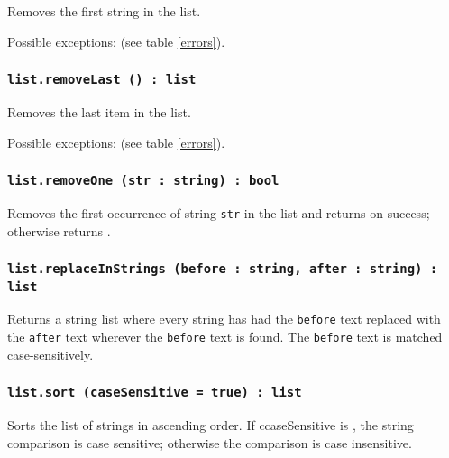 Removes the first string in the list.

Possible exceptions:  (see table \ref{errors}).

\subsubsection{\texttt{list.removeLast () : list}}

Removes the last item in the list.

Possible exceptions:  (see table \ref{errors}).

\subsubsection{\texttt{list.removeOne (str : string) : bool}}

Removes the first occurrence of string \texttt{str} in the list and returns \true{} on success; otherwise returns \false.

\subsubsection{\texttt{list.replaceInStrings (before : string, after : string) : list}}

Returns a string list where every string has had the \texttt{before} text replaced with the \texttt{after} text wherever the \texttt{before} text is found. The \texttt{before} text is matched case-sensitively.

\subsubsection{\texttt{list.sort (caseSensitive = true) : list}}

Sorts the list of strings in ascending order. If {ccaseSensitive} is \true, the string comparison is case sensitive; otherwise the comparison is case insensitive.
